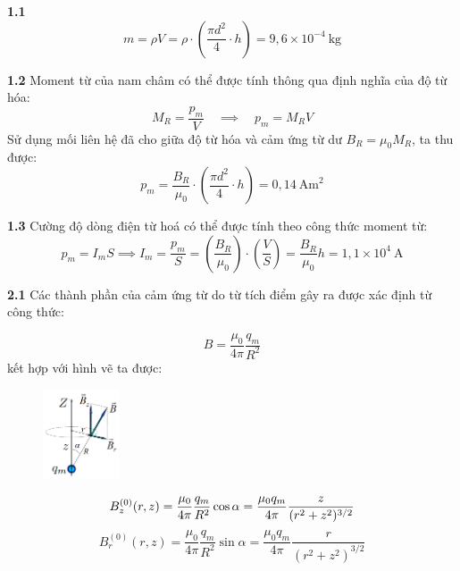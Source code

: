 \noindent\textbf{1.1}
\begin{equation*}
  m = \rho V = \rho \cdot \left(\frac{\pi d^2}{4} \cdot h\right) = 9{,}6 \times 10^{-4}~\text{kg}
\end{equation*}

\noindent\textbf{1.2} Moment từ của nam châm có thể được tính thông qua định nghĩa của độ từ hóa:
\begin{equation*}
  M_R = \frac{p_m}{V} \quad \implies \quad p_m = M_R V
\end{equation*}
Sử dụng mối liên hệ đã cho giữa độ từ hóa và cảm ứng từ dư $B_R = \mu_0 M_R$, ta thu được:
\begin{equation*}
  p_m = \frac{B_R}{\mu_0} \cdot \left( \frac{\pi d^2}{4} \cdot h \right) = 0{,}14~\text{Am}^2
\end{equation*}

\noindent\textbf{1.3} Cường độ dòng điện từ hoá có thể được tính theo công thức moment từ:
\begin{equation*}
  p_m = I_m S \implies I_m = \frac{p_m}{S} = \left( \frac{B_R}{\mu_0} \right) \cdot \left( \frac{V}{S} \right) = \frac{B_R}{\mu_0} h = 1{,}1 \times 10^4~\text{A}
\end{equation*}

\noindent\textbf{2.1} Các thành phần của cảm ứng từ do từ tích điểm gây ra được xác định từ công thức:

\begin{equation*}
  B = \frac{\mu_0}{4\pi}\frac{q_m}{R^2}
\end{equation*}
kết hợp với hình vẽ ta được:
\begin{figure}[H]
  \centering
  \includegraphics[width=0.2\textwidth]{Figures/Solutions/Fig 2.1.png}
\end{figure}

\begin{equation*}
  B^{(0)}_z(r, z)  = \frac{\mu_0}{4\pi}\frac{q_m}{R^2} \cos \alpha = \frac{\mu_0 q_m}{4\pi} \frac{z}{(r^2 + z^2)^{3/2}} \\
\end{equation*}
\begin{equation*}
  B^{(0)}_r(r, z)  = \frac{\mu_0}{4\pi}\frac{q_m}{R^2} \sin \alpha = \frac{\mu_0 q_m}{4\pi} \frac{r}{(r^2 + z^2)^{3/2}}
\end{equation*}


